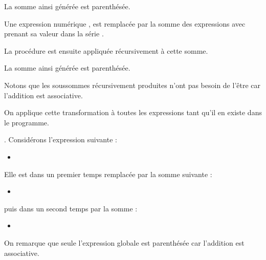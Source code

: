 \documentclass[letterpaper,10pt,french]{sphinxmanual}
\begin{document}
\sphinxAtStartPar
La somme ainsi générée est parenthésée.

\sphinxAtStartPar
Une expression numérique
,
est remplacée par la somme des expressions
 avec  prenant sa valeur
dans la série .

\sphinxAtStartPar
La procédure est ensuite appliquée récursivement à cette somme.

\sphinxAtStartPar
La somme ainsi générée est parenthésée.

\sphinxAtStartPar
Notons que les sous\sphinxhyphen{}sommes récursivement produites n’ont pas besoin de l’être
car l’addition est associative.

\sphinxAtStartPar
On applique cette transformation à toutes les expressions  tant
qu’il en existe dans le programme.

\sphinxAtStartPar
{}. Considérons l’expression suivante :
\begin{itemize}
\item {} 
\sphinxAtStartPar
{}

\end{itemize}

\sphinxAtStartPar
Elle est dans un premier temps remplacée par la somme suivante :
\begin{itemize}
\item {} 
\sphinxAtStartPar
{}

\end{itemize}

\sphinxAtStartPar
puis dans un second temps par la somme :
\begin{itemize}
\item {} 
\sphinxAtStartPar
{}

\end{itemize}

\sphinxAtStartPar
On remarque que seule l’expression globale est parenthésée car l’addition est
associative.
\end{document}
